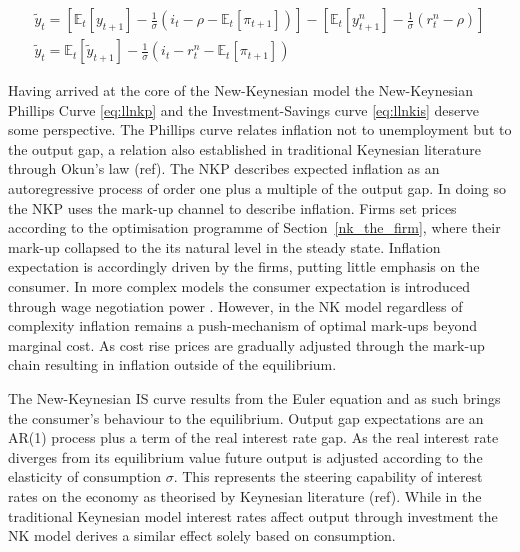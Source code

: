 \documentclass[12pt,a4paper,english]{article} %
\newcommand{\E}{\mathbb{E}} %
\begin{document}
	\begin{equation}  \label{eq:llnkis}
		\begin{aligned}
			\tilde{y}_t = 
			\left[
			\E_t[y_{t+1}] - \frac{1}{\sigma} (i_t - \rho - \E_t[\pi_{t+1}])
			\right]
			-
			\left[
			\E_t[y_{t+1}^n] - \frac{1}{\sigma} (r_t^n - \rho)
			\right] \\
			\tilde{y}_t = \E_t[\tilde{y}_{t+1}] - \frac{1}{\sigma} (i_t - r_t^n - \E_t[\pi_{t+1}])
		\end{aligned}
	\end{equation}
	
	Having arrived at the core of the New-Keynesian model the New-Keynesian Phillips Curve \eqref{eq:llnkp} and the Investment-Savings curve \eqref{eq:llnkis} deserve some perspective. 
	The Phillips curve relates inflation not to unemployment but to the output gap, a relation also established in traditional Keynesian literature through Okun's law (ref). The NKP describes expected inflation as an autoregressive process of order one plus a multiple of the output gap. In doing so the \ac{NKP} uses the mark-up channel to describe inflation. Firms set prices according to the optimisation programme of Section~\ref{nk_the_firm}, where their mark-up collapsed to the its natural level in the steady state. Inflation expectation is accordingly driven by the firms, putting little emphasis on the consumer. In more complex models the consumer expectation is introduced through wage negotiation power \cite{smets_shocks_2007}. However, in the NK model regardless of complexity inflation remains a push-mechanism of optimal mark-ups beyond marginal cost. As cost rise prices are gradually adjusted through the mark-up chain resulting in inflation outside of the equilibrium.
	
	The New-Keynesian \ac{IS} curve results from the Euler equation and as such brings the consumer's behaviour to the equilibrium. Output gap expectations are an AR(1) process plus a term of the real interest rate gap. As the real interest rate diverges from its equilibrium value future output is adjusted according to the elasticity of consumption $\sigma$. This represents the steering capability of interest rates on the economy as theorised by Keynesian literature (ref). While in the traditional Keynesian model interest rates affect output through investment the NK model derives a similar effect solely based on consumption. 
\end{document}

